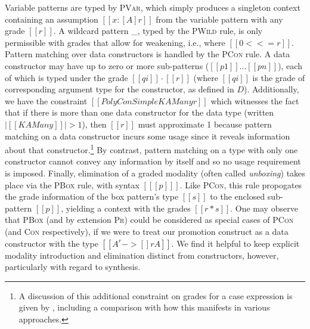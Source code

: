 Variable patterns are typed by \textsc{PVar}, which simply produces a singleton
context containing an assumption $[[ x : [A] r]]$ from the variable pattern with any
grade $[[ r ]]$. A wildcard pattern \_, typed by the \textsc{PWild} rule, is only permissible with grades that
allow for weakening, i.e., where $[[ 0 <<= r ]]$.
Pattern matching over data constructors is handled by the \textsc{PCon} rule. A data constructor may have up to zero or more sub-patterns
($[[ p1 ]] ... [[ pn ]]$), each of which is typed under the grade
$[[ qi ]] \cdot [[ r ]]$ (where $[[ qi ]]$ is the grade of corresponding
argument type for the constructor, as defined in $D$). Additionally, we have the constraint
$[[{PolyConSimple {K {A Many}} r}]]$ which witnesses the fact that if there is more than
one data constructor for the data type (written $|[[ K {A Many} ]]| > 1$), then
$[[ r ]]$ must approximate 1 because pattern matching on a data constructor incurs
some usage since it reveals information about that constructor.\footnote{A discussion
of this additional constraint on grades for a case expression is given
by \citet{DBLP:journals/corr/abs-2112-14966}, including
a comparison with how this manifests in various approaches.} By contrast,
pattern matching on a type with only
one constructor cannot convey any information by itself and so no usage
requirement is imposed. Finally, elimination of a graded modality
(often called \textit{unboxing}) takes place via the \textsc{PBox} rule, with syntax $[[ [p] ]]$.
Like \textsc{PCon}, this rule propogates the grade information of the box pattern's type $[[s]]$ to
the enclosed sub-pattern $[[ p ]]$, yielding a context with the grades
$[[r * s]]$. One may observe that \textsc{PBox} (and by extension \textsc{Pr})
could be considered as special cases of \textsc{PCon} (and \textsc{Con}
respectively), if we were to treat our promotion construct as a data constructor
with the type $[[ A ^ r -> {[] r A} ]]$. We find it helpful to keep explicit
modality introduction and elimination distinct from constructors, however,
particularly with regard to synthesis.

